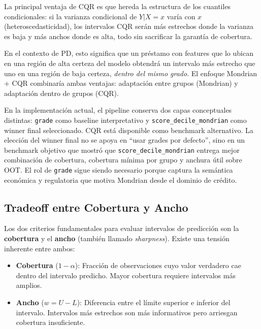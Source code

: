 \documentclass[
  spanish,
  11pt,
  letterpaper,
]{scrbook}
\providecommand{\tightlist}{%
  \setlength{\itemsep}{0pt}\setlength{\parskip}{0pt}}
\theoremstyle{plain}
\theoremstyle{remark}
\begin{document}
La principal ventaja de CQR es que hereda la estructura de los cuantiles
condicionales: si la varianza condicional de \(Y|X = x\) varía con \(x\)
(heteroscedasticidad), los intervalos CQR serán más estrechos donde la
varianza es baja y más anchos donde es alta, todo sin sacrificar la
garantía de cobertura.

En el contexto de PD, esto significa que un préstamo con features que lo
ubican en una región de alta certeza del modelo obtendrá un intervalo
más estrecho que uno en una región de baja certeza, \emph{dentro del
mismo grado}. El enfoque Mondrian + CQR combinaría ambas ventajas:
adaptación entre grupos (Mondrian) y adaptación dentro de grupos (CQR).

\begin{tcolorbox}[enhanced jigsaw, arc=.35mm, bottomrule=.15mm, bottomtitle=1mm, breakable, colback=white, colbacktitle=quarto-callout-note-color!10!white, colframe=quarto-callout-note-color-frame, coltitle=black, left=2mm, leftrule=.75mm, opacityback=0, opacitybacktitle=0.6, rightrule=.15mm, title=\textcolor{quarto-callout-note-color}{\faInfo}\hspace{0.5em}{CQR en este proyecto}, titlerule=0mm, toprule=.15mm, toptitle=1mm]

En la implementación actual, el pipeline conserva dos capas conceptuales
distintas: \texttt{grade} como baseline interpretativo y
\texttt{score\_decile\_mondrian} como winner final seleccionado. CQR
está disponible como benchmark alternativo. La elección del winner final
no se apoya en ``usar grades por defecto'', sino en un benchmark
objetivo que mostró que \texttt{score\_decile\_mondrian} entrega mejor
combinación de cobertura, cobertura mínima por grupo y anchura útil
sobre OOT. El rol de \texttt{grade} sigue siendo necesario porque
captura la semántica económica y regulatoria que motiva Mondrian desde
el dominio de crédito.

\end{tcolorbox}

\subsection{Tradeoff entre Cobertura y
Ancho}\label{sec-coverage-width-tradeoff}

Los dos criterios fundamentales para evaluar intervalos de predicción
son la \textbf{cobertura} y el \textbf{ancho} (también llamado
\emph{sharpness}). Existe una tensión inherente entre ambos:

\begin{itemize}
\tightlist
\item
  \textbf{Cobertura} (\(1 - \alpha\)): Fracción de observaciones cuyo
  valor verdadero cae dentro del intervalo predicho. Mayor cobertura
  requiere intervalos más amplios.
\item
  \textbf{Ancho} (\(w = U - L\)): Diferencia entre el límite superior e
  inferior del intervalo. Intervalos más estrechos son más informativos
  pero arriesgan cobertura insuficiente.
\end{itemize}
\end{document}
